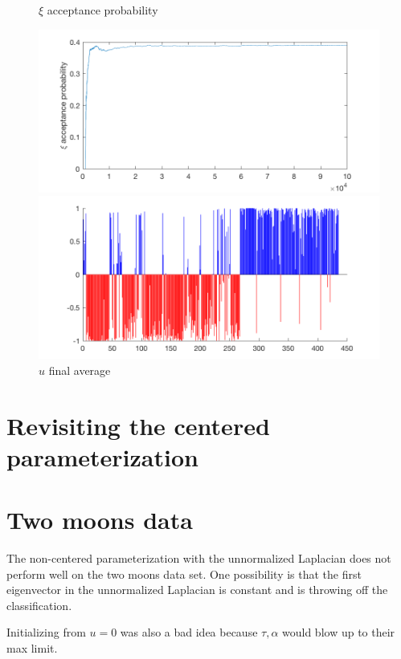 \documentclass{siamart1116}
\begin{document}
\begin{figure}[!htb]
    \begin{minipage}{0.48\textwidth}
        \centering
        \caption{\label{fig:hier_sim_5} $\xi$ acceptance probability}
        \includegraphics[width=\linewidth]{graphics/noncentered/acceptance_xi_probability.png}
    \end{minipage} \hfill
    \begin{minipage}{0.48\textwidth}
        \centering
        \caption{\label{fig:hier_sim_6} $u$ final average}
        \includegraphics[width=\linewidth]{graphics/noncentered/final_avg.png}
    \end{minipage}
\end{figure}

\section{Revisiting the centered parameterization}

\section{Two moons data}
The non-centered parameterization with the unnormalized Laplacian does not perform well on the two moons data set. One possibility is that the first eigenvector in the unnormalized Laplacian is constant and is throwing off the classification. %

Initializing from $u=0$ was also a bad idea because $\tau, \alpha$ would blow up to their max limit.
\end{document}
